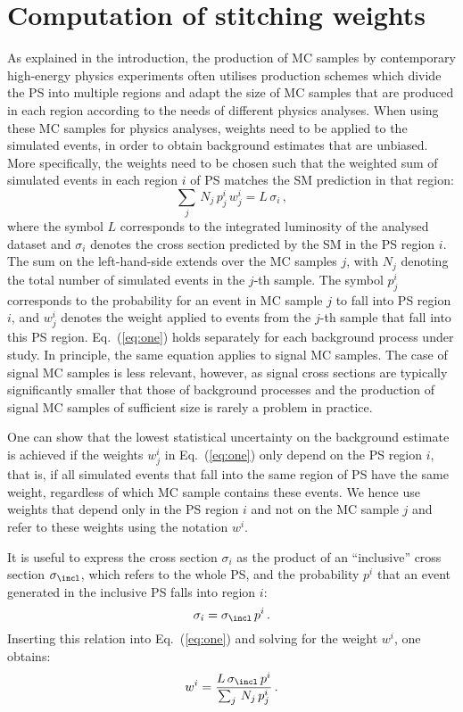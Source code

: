 \section{Computation of stitching weights}
\label{sec:stitching_weights}

As explained in the introduction,
the production of MC samples by contemporary high-energy physics experiments often utilises production schemes
which divide the PS into multiple regions and adapt the size of MC samples that are produced in each region 
according to the needs of different physics analyses.
When using these MC samples for physics analyses,
weights need to be applied to the simulated events, in order to obtain background estimates that are unbiased.
More specifically, the weights need to be chosen such that the weighted sum of simulated events in each region $i$ of PS 
matches the SM prediction in that region:
\begin{equation}
\sum_{j} \, N_{j} \, p_{j}^{i} \, w_{j}^{i} = L \, \sigma_{i} \, ,
\label{eq:one}
\end{equation}
where the symbol $L$ corresponds to the integrated luminosity of the analysed dataset
and $\sigma_{i}$ denotes the cross section predicted by the SM in the PS region $i$.
The sum on the left-hand-side extends over the MC samples $j$,
with $N_{j}$ denoting the total number of simulated events in the $j$-th sample.
The symbol $p_{j}^{i}$ corresponds to the probability for an event in MC sample $j$ to fall into PS region $i$,
and $w_{j}^{i}$ denotes the weight applied to events from the $j$-th sample that fall into this PS region.
Eq.~(\ref{eq:one}) holds separately for each background process under study.
In principle, the same equation applies to signal MC samples. 
The case of signal MC samples is less relevant, however,
as signal cross sections are typically significantly smaller that those of background processes 
and the production of signal MC samples of sufficient size is rarely a problem in practice.

One can show that the lowest statistical uncertainty on the background estimate is achieved 
if the weights $w_{j}^{i}$ in Eq.~(\ref{eq:one}) only depend on the PS region $i$,
that is, if all simulated events that fall into the same region of PS have the same weight,
regardless of which MC sample contains these events.
We hence use weights that depend only in the PS region $i$ and not on the MC sample $j$ 
and refer to these weights using the notation $w^{i}$.

It is useful to express the cross section $\sigma_{i}$ as the product of an ``inclusive'' cross section $\sigma_{\incl}$,
which refers to the whole PS, and the probability $p^{i}$ that an event generated in the inclusive PS falls into region $i$:
\begin{equation*}
\sigma_{i} = \sigma_{\incl} \, p^{i} \, .
\label{eq:two}
\end{equation*}
Inserting this relation into Eq.~(\ref{eq:one}) and solving for the weight $w^{i}$, one obtains:
\begin{equation}
w^{i} = \frac{L \, \sigma_{\incl} \, p^{i}}{\sum_{j} \, N_{j} \, p_{j}^{i}} \, .
\label{eq:master}
\end{equation}

